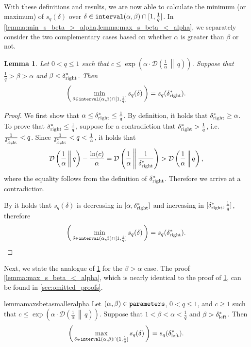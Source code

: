 \documentclass[letterpaper,11pt]{article}
\newcommand{\1}[1]{\mathds{1}\left[#1\right]}
\newcommand{\D}[2]{\mathcal{D}\left(#1\, \middle\|\,#2 \right)}
\newcommand{\goodd}{\textnormal{\texttt{interval}}(\alpha, \beta)}
\newcommand{\params}{\textnormal{\texttt{parameters}}}
\newtheorem{lemma}[theorem]{Lemma}
\newcommand{\sdeltal}{\delta^{*}_{\textnormal{left}}}
\newcommand{\sdeltar}{\delta^{*}_{\textnormal{right}}}
\begin{document}
With these definitions and results, we are now able to calculate the minimum (or maximum)
of $s_q(\delta)$ over $\delta \in \goodd \cap [1,\frac{1}{q}]$.
In \cref{lemma:min_s_beta_>_alpha,lemma:max_s_beta_<_alpha}, we separately consider
the two complementary cases based on whether $\alpha$ is greater than $\beta$ or not.

\begin{lemma}\label{lemma:min_s_beta_>_alpha}
	Let $0 < q \leq 1$ such that $c\leq \exp\left(\alpha\cdot \D{\frac{1}{\alpha}}{q}\right)$.
	Suppose that $\frac{1}{q} > \beta > \alpha$ and $\beta < \sdeltar$.
	Then
	\begin{equation*}
		\biggl(\,\min_{\delta \in \goodd \cap [1,\frac{1}{q}]} s_q(\delta)\,\biggr) = s_{q}(\sdeltar).
	\end{equation*}
\end{lemma}

\begin{proof}
		We first show that  $\alpha \leq \sdeltar \leq \frac{1}{q}$. 
		By definition, it holds that $\sdeltar \geq \alpha$.
		To prove that $\sdeltar \leq \frac{1}{q}$, suppose for a contradiction that
		$\sdeltar > \frac{1}{q}$, i.e. $\frac{1}{\sdeltar} < q$.
		Since $\frac{1}{\sdeltar} < q < \frac{1}{\alpha}$, it holds that
		\begin{equation*}
			\D{\frac{1}{\alpha}}{q} - \frac{\ln(c)}{\alpha} = \D{\frac{1}{\alpha}}{\frac{1}{\sdeltar}} > \D{\frac{1}{\alpha}}{q},
		\end{equation*}
		where the equality follows from the definition of $\sdeltar$.
		Therefore we arrive at a contradiction.
		
		By  it holds that $s_q(\delta)$ is decreasing in $[\alpha, \sdeltar]$ and increasing in $[\sdeltar,\frac{1}{q}]$, therefore 
			\begin{equation*}
			\biggl(\,\min_{\delta \in \goodd \cap [1,\frac{1}{q}]} s_q(\delta)\,\biggr) = s_{q}(\sdeltar).
		\end{equation*}
\end{proof}

Next, we state the analogue of \cref{lemma:min_s_beta_>_alpha} for the $\beta > \alpha$ case.
The proof \cref{lemma:max_s_beta_<_alpha}, which is nearly identical to the proof of \cref{lemma:min_s_beta_>_alpha},
can be found in \cref{sec:omitted_proofs}.

\begin{restatable}{lemma}{maxsbetasmalleralpha}
	\label{lemma:max_s_beta_<_alpha}
	Let $(\alpha, \beta) \in \params$, $0 < q \leq 1$, and $c \geq 1$ such that $c\leq \exp\left(\alpha\cdot \D{\frac{1}{\alpha}}{q}\right)$.
	Suppose that $1 < \beta < \alpha < \frac{1}{q}$ and $\beta > \sdeltal$.
	Then
	\begin{equation*}
		\biggl(\,\max_{\delta \in \goodd \cap [1,\frac{1}{q}]} s_q(\delta)\,\biggr) = s_{q}(\sdeltal).
	\end{equation*}	
\end{restatable}
\end{document}
